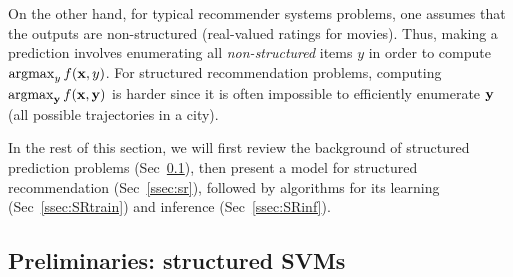 On the other hand, for typical recommender systems problems, one assumes that the outputs are non-structured (\eg real-valued ratings for movies).
Thus, making a prediction involves enumerating all {\em non-structured} items $y$ in order to compute $\operatorname*{argmax}_y f(\mathbf{x},y)$.
For structured recommendation problems, computing $\operatorname*{argmax}_{\mathbf{y}} f(\mathbf{x},\mathbf{y})$ is harder since it is often impossible to efficiently enumerate $\mathbf{y}$ (\eg all possible trajectories in a city).

In the rest of this section, we will first review the background of structured prediction problems (Sec~\ref{ssec:ssvm}), then present a model for structured recommendation (Sec~\ref{ssec:sr}), followed by algorithms for its learning (Sec~\ref{ssec:SRtrain}) and inference (Sec~\ref{ssec:SRinf}).



\subsection{Preliminaries: structured SVMs}
\label{ssec:ssvm}

